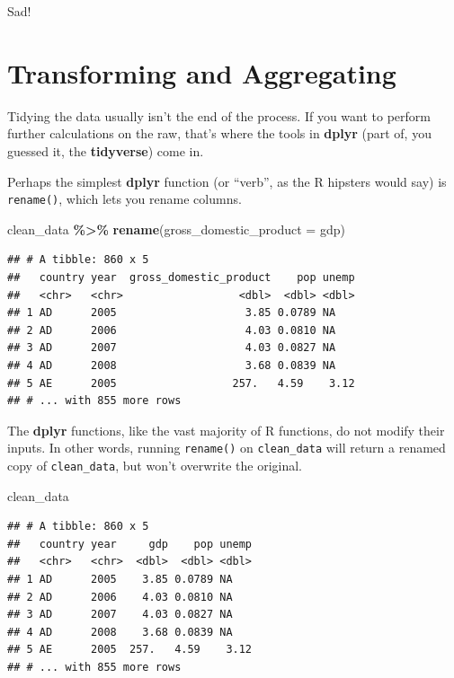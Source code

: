 \documentclass[
  12pt,
  oneside,openany]{book}
\newenvironment{Shaded}{\begin{snugshade}}{\end{snugshade}}
\newcommand{\DataTypeTok}[1]{\textcolor[rgb]{0.13,0.29,0.53}{#1}}
\newcommand{\KeywordTok}[1]{\textcolor[rgb]{0.13,0.29,0.53}{\textbf{#1}}}
\newcommand{\NormalTok}[1]{#1}
\newcommand{\OperatorTok}[1]{\textcolor[rgb]{0.81,0.36,0.00}{\textbf{#1}}}
\newcommand{\StringTok}[1]{\textcolor[rgb]{0.31,0.60,0.02}{#1}}
\begin{document}
Sad!

\hypertarget{transforming-and-aggregating}{%
\section{Transforming and Aggregating}\label{transforming-and-aggregating}}

Tidying the data usually isn't the end of the process. If you want to perform further calculations on the raw, that's where the tools in \textbf{dplyr} (part of, you guessed it, the \textbf{tidyverse}) come in.

Perhaps the simplest \textbf{dplyr} function (or ``verb'', as the R hipsters would say) is \texttt{rename()}, which lets you rename columns.

\begin{Shaded}
\begin{Highlighting}[]
\NormalTok{clean\_data }\OperatorTok{\%\textgreater{}\%}
\StringTok{  }\KeywordTok{rename}\NormalTok{(}\DataTypeTok{gross\_domestic\_product =}\NormalTok{ gdp)}
\end{Highlighting}
\end{Shaded}

\begin{verbatim}
## # A tibble: 860 x 5
##   country year  gross_domestic_product    pop unemp
##   <chr>   <chr>                  <dbl>  <dbl> <dbl>
## 1 AD      2005                    3.85 0.0789 NA   
## 2 AD      2006                    4.03 0.0810 NA   
## 3 AD      2007                    4.03 0.0827 NA   
## 4 AD      2008                    3.68 0.0839 NA   
## 5 AE      2005                  257.   4.59    3.12
## # ... with 855 more rows
\end{verbatim}

The \textbf{dplyr} functions, like the vast majority of R functions, do not modify their inputs. In other words, running \texttt{rename()} on \texttt{clean\_data} will return a renamed copy of \texttt{clean\_data}, but won't overwrite the original.

\begin{Shaded}
\begin{Highlighting}[]
\NormalTok{clean\_data}
\end{Highlighting}
\end{Shaded}

\begin{verbatim}
## # A tibble: 860 x 5
##   country year     gdp    pop unemp
##   <chr>   <chr>  <dbl>  <dbl> <dbl>
## 1 AD      2005    3.85 0.0789 NA   
## 2 AD      2006    4.03 0.0810 NA   
## 3 AD      2007    4.03 0.0827 NA   
## 4 AD      2008    3.68 0.0839 NA   
## 5 AE      2005  257.   4.59    3.12
## # ... with 855 more rows
\end{verbatim}
\end{document}
